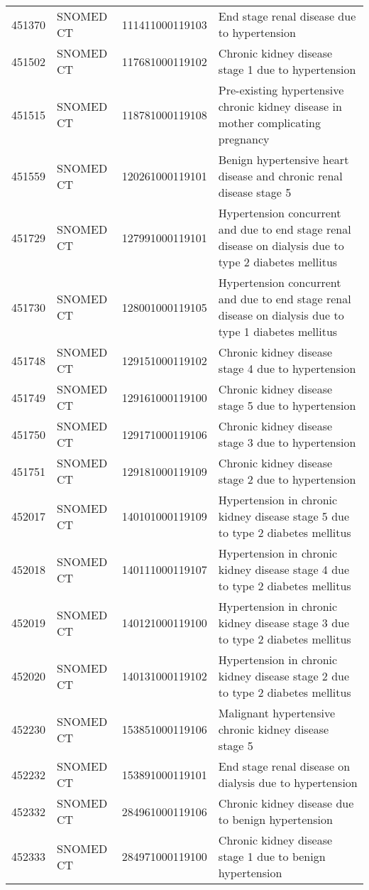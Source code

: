 \begin{table}[ht]
\begin{tabular}{rlll}
  451370 & SNOMED CT & 111411000119103 & End stage renal disease due to hypertension \\ 
  451502 & SNOMED CT & 117681000119102 & Chronic kidney disease stage 1 due to hypertension \\ 
  451515 & SNOMED CT & 118781000119108 & Pre-existing hypertensive chronic kidney disease in mother complicating pregnancy \\ 
  451559 & SNOMED CT & 120261000119101 & Benign hypertensive heart disease and chronic renal disease stage 5 \\ 
  451729 & SNOMED CT & 127991000119101 & Hypertension concurrent and due to end stage renal disease on dialysis due to type 2 diabetes mellitus \\ 
  451730 & SNOMED CT & 128001000119105 & Hypertension concurrent and due to end stage renal disease on dialysis due to type 1 diabetes mellitus \\ 
  451748 & SNOMED CT & 129151000119102 & Chronic kidney disease stage 4 due to hypertension \\ 
  451749 & SNOMED CT & 129161000119100 & Chronic kidney disease stage 5 due to hypertension \\ 
  451750 & SNOMED CT & 129171000119106 & Chronic kidney disease stage 3 due to hypertension \\ 
  451751 & SNOMED CT & 129181000119109 & Chronic kidney disease stage 2 due to hypertension \\ 
  452017 & SNOMED CT & 140101000119109 & Hypertension in chronic kidney disease stage 5 due to type 2 diabetes mellitus \\ 
  452018 & SNOMED CT & 140111000119107 & Hypertension in chronic kidney disease stage 4 due to type 2 diabetes mellitus \\ 
  452019 & SNOMED CT & 140121000119100 & Hypertension in chronic kidney disease stage 3 due to type 2 diabetes mellitus \\ 
  452020 & SNOMED CT & 140131000119102 & Hypertension in chronic kidney disease stage 2 due to type 2 diabetes mellitus \\ 
  452230 & SNOMED CT & 153851000119106 & Malignant hypertensive chronic kidney disease stage 5 \\ 
  452232 & SNOMED CT & 153891000119101 & End stage renal disease on dialysis due to hypertension \\ 
  452332 & SNOMED CT & 284961000119106 & Chronic kidney disease due to benign hypertension \\ 
  452333 & SNOMED CT & 284971000119100 & Chronic kidney disease stage 1 due to benign hypertension \\ 

\end{tabular}
\end{table}
